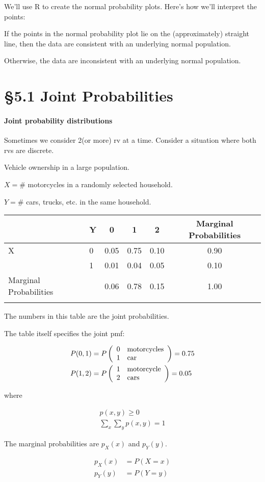 \documentclass[../Notes.tex]{subfiles}
\begin{document}
    We'll use R to create the normal probability plots. Here's how we'll interpret the points:

    If the points in the normal probability plot lie on the (approximately) straight line, then the data are consistent with an underlying normal population.

    Otherwise, the data are inconsistent with an underlying normal population.

    \pagebreak

    \section*{\S 5.1 Joint Probabilities}

    \paragraph*{Joint probability distributions}
    Sometimes we consider 2(or more) rv at a time. Consider a situation where both rvs are discrete.

     Vehicle ownership in a large population.
    
    $X = \#$ motorcycles in a randomly selected household.

    $Y = \#$ cars, trucks, etc. in the same household.

    \begin{tabular}{l l | c c c | c}
          & Y & 0 & 1 & 2 & Marginal Probabilities         \\
        \hline
        X & 0 & 0.05 & 0.75 & 0.10 & 0.90   \\
          & 1 & 0.01 & 0.04 & 0.05 & 0.10   \\
        \hline
        Marginal Probabilities  
          &   & 0.06 & 0.78 & 0.15 & 1.00   \\
          &   &      &      &      &
    \end{tabular}

    The numbers in this table are the joint probabilities.

    The table itself specifies the joint pmf:

    \begin{align*}
        P(0,1) & = P\left(\begin{array}{l l} 0 & \text{motorcycles} \\ 1 & \text{car} \end{array}\right) = 0.75  \\
        P(1,2) & = P\left(\begin{array}{l l} 1 & \text{motorcycle} \\ 2 & \text{cars} \end{array}\right) = 0.05
    \end{align*}

    where
    
    \begin{align}
        p(x,y) \geq 0              \\  
        \sum_{x}\sum_{y}p(x,y) = 1  
    \end{align}

    The marginal probabilities are $p_{X}(x)$ and $p_{Y}(y)$.

    \begin{align}
        p_{X}(x) & = P(X = x)   \\
        p_{Y}(y) & = P(Y = y)
    \end{align}
    
\end{document}
